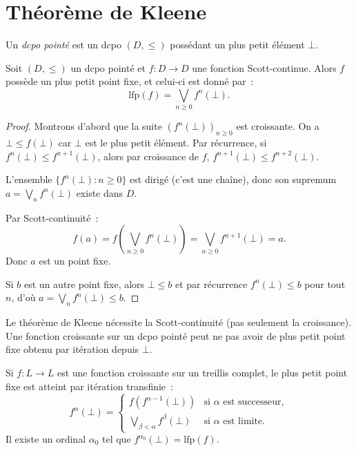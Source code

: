 \section{Th\'eor\`eme de Kleene}

\begin{definition}
Un \emph{dcpo point\'e} est un dcpo $(D, \leq)$ poss\'edant un plus petit \'el\'ement $\bot$.
\end{definition}

\begin{theoreme}[Kleene]
\label{thm:kleene}
Soit $(D, \leq)$ un dcpo point\'e et $f\colon D \to D$ une fonction Scott-continue. Alors
$f$ poss\`ede un plus petit point fixe, et celui-ci est donn\'e par~:
\[
  \mathrm{lfp}(f) = \bigvee_{n \geq 0} f^n(\bot).
\]
\end{theoreme}

\begin{proof}
Montrons d'abord que la suite $(f^n(\bot))_{n \geq 0}$ est croissante. On a
$\bot \leq f(\bot)$ car $\bot$ est le plus petit \'el\'ement. Par r\'ecurrence, si
$f^n(\bot) \leq f^{n+1}(\bot)$, alors par croissance de $f$,
$f^{n+1}(\bot) \leq f^{n+2}(\bot)$.

L'ensemble $\{f^n(\bot) : n \geq 0\}$ est dirig\'e (c'est une cha\^ine), donc son
supremum $a = \bigvee_n f^n(\bot)$ existe dans $D$.

Par Scott-continuit\'e~:
\[
  f(a) = f\!\left(\bigvee_{n \geq 0} f^n(\bot)\right) = \bigvee_{n \geq 0} f^{n+1}(\bot) = a.
\]
Donc $a$ est un point fixe.

Si $b$ est un autre point fixe, alors $\bot \leq b$ et par r\'ecurrence $f^n(\bot) \leq b$
pour tout $n$, d'o\`u $a = \bigvee_n f^n(\bot) \leq b$.
\end{proof}

\begin{attention}
Le th\'eor\`eme de Kleene n\'ecessite la Scott-continuit\'e (pas seulement la
croissance). Une fonction croissante sur un dcpo point\'e peut ne pas avoir de plus petit
point fixe obtenu par it\'eration depuis $\bot$.
\end{attention}

\begin{corollaire}
Si $f\colon L \to L$ est une fonction croissante sur un treillis complet, le plus petit
point fixe est atteint par it\'eration transfinie~:
\[
  f^\alpha(\bot) = \begin{cases}
    f(f^{\alpha-1}(\bot)) & \text{si } \alpha \text{ est successeur}, \\
    \bigvee_{\beta < \alpha} f^\beta(\bot) & \text{si } \alpha \text{ est limite}.
  \end{cases}
\]
Il existe un ordinal $\alpha_0$ tel que $f^{\alpha_0}(\bot) = \mathrm{lfp}(f)$.
\end{corollaire}


